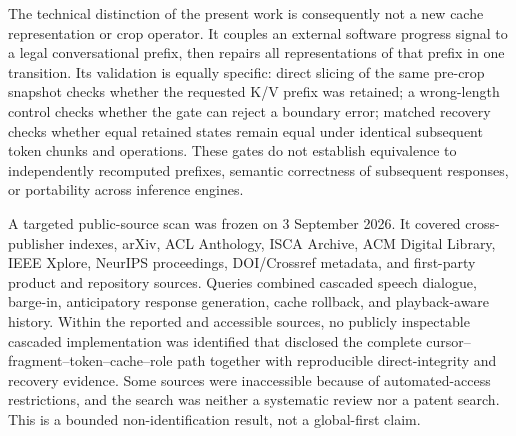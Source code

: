 The technical distinction of the present work is consequently not a new cache representation or crop operator. It couples an external software progress signal to a legal conversational prefix, then repairs all representations of that prefix in one transition. Its validation is equally specific: direct slicing of the same pre-crop snapshot checks whether the requested K/V prefix was retained; a wrong-length control checks whether the gate can reject a boundary error; matched recovery checks whether equal retained states remain equal under identical subsequent token chunks and operations. These gates do not establish equivalence to independently recomputed prefixes, semantic correctness of subsequent responses, or portability across inference engines.

A targeted public-source scan was frozen on 3 September 2026. It covered cross-publisher indexes, arXiv, ACL Anthology, ISCA Archive, ACM Digital Library, IEEE Xplore, NeurIPS proceedings, DOI/Crossref metadata, and first-party product and repository sources. Queries combined cascaded speech dialogue, barge-in, anticipatory response generation, cache rollback, and playback-aware history. Within the reported and accessible sources, no publicly inspectable cascaded implementation was identified that disclosed the complete cursor--fragment--token--cache--role path together with reproducible direct-integrity and recovery evidence. Some sources were inaccessible because of automated-access restrictions, and the search was neither a systematic review nor a patent search. This is a bounded non-identification result, not a global-first claim.
